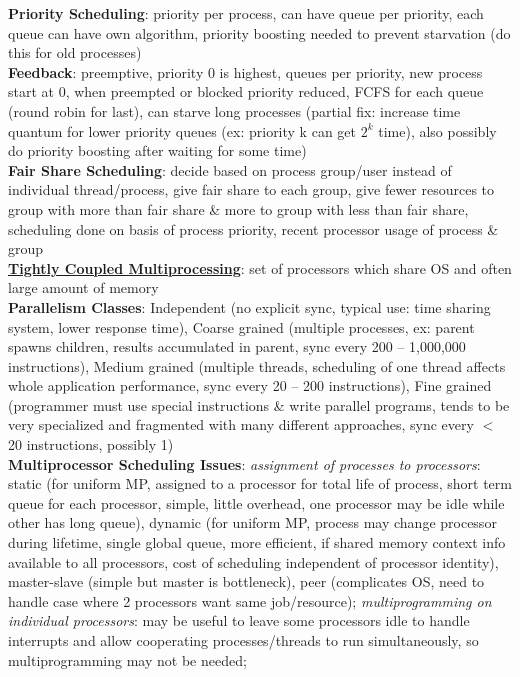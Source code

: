 \documentclass[a4paper]{article}
\begin{document}
\begin{multicols}{2}
        \textbf{Priority Scheduling}: priority per process, can have queue per priority, each queue can have own algorithm, priority boosting needed to prevent starvation (do this for old processes)\\
        \textbf{Feedback}: preemptive, priority 0 is highest, queues per priority, new process start at 0, when preempted or blocked priority reduced, FCFS for each queue (round robin for last), can starve long processes (partial fix: increase time quantum for lower priority queues (ex: priority k can get $2^k$ time), also possibly do priority boosting after waiting for some time)\\
        \textbf{Fair Share Scheduling}: decide based on process group/user instead of individual thread/process, give fair share to each group, give fewer resources to group with more than fair share \& more to group with less than fair share, scheduling done on basis of process priority, recent processor usage of process \& group\\
        \underline{\textbf{Tightly Coupled Multiprocessing}}: set of processors which share OS and often large amount of memory\\
        \textbf{Parallelism Classes}: Independent (no explicit sync, typical use: time sharing system, lower response time), Coarse grained (multiple processes, ex: parent spawns children, results accumulated in parent, sync every 200 – 1,000,000 instructions), Medium grained (multiple threads, scheduling of one thread affects whole application performance, sync every 20 – 200 instructions), Fine grained (programmer must use special instructions \& write parallel programs, tends to be very specialized and fragmented with many different approaches, sync every $<$ 20 instructions, possibly 1)\\
        \textbf{Multiprocessor Scheduling Issues}:
        \textit{assignment of processes to processors}: static (for uniform MP, assigned to a processor for total life of process, short term queue for each processor, simple, little overhead, one processor may be idle while other has long queue), dynamic (for uniform MP, process may change processor during lifetime, single global queue, more efficient, if shared memory context info available to all processors, cost of scheduling independent of processor identity), master-slave (simple but master is bottleneck), peer (complicates OS, need to handle case where 2 processors want same job/resource);
        \textit{multiprogramming on individual processors}: may be useful to leave some processors idle to handle interrupts and allow cooperating processes/threads to run simultaneously, so multiprogramming may not be needed;

\end{multicols}
\end{document}
